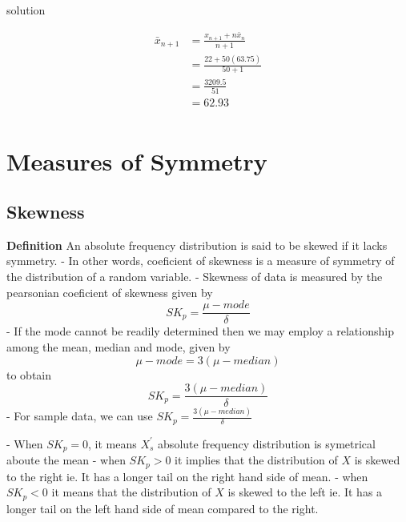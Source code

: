 \documentclass[12pt]{article}
\begin{document}
solution



\begin{align*}
    \bar{x}_{n + 1} & = \frac{x_{n+1} + n\bar{x}_n}{n + 1} \\
                    & = \frac{22 + 50(63.75)}{50 + 1}      \\
                    & = \frac{3209.5}{51}                  \\
                    & = 62.93                              \\
\end{align*}

\newpage

\section{Measures of Symmetry}
\subsection{Skewness}
\textbf{Definition} An absolute frequency distribution is said to be skewed if it lacks symmetry.
- In other words, coeficient of skewness is a measure of symmetry of the distribution of a random variable.
- Skewness of data is measured by the pearsonian coeficient of skewness given by
\begin{equation}
    SK_p = \frac{\mu - mode}{\delta}
\end{equation}
- If the mode cannot be readily determined then we may employ a relationship among the mean, median and mode, given by
\begin{equation}
    \mu - mode = 3(\mu - median)
\end{equation}
to obtain
\begin{equation}
    SK_p = \frac{3(\mu - median)}{\delta}
\end{equation}
- For sample data, we can use $SK_p = \frac{3(\mu - median)}{\delta}$

- When $SK_p = 0$, it means $X_s^{'}$ absolute frequency distribution is symetrical aboute the mean
- when $SK_p > 0$ it implies that the distribution of $X$ is skewed to the right ie. It has a longer tail on the right hand side of mean.
- when $SK_p < 0$ it means that the distribution of $X$ is skewed to the left ie. It has a longer tail on the left hand side of mean compared to the right.
\end{document}
